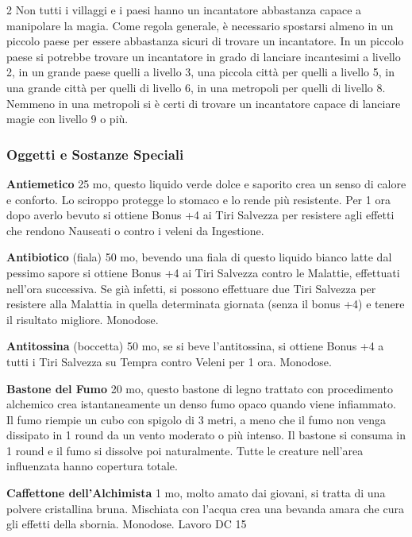 \begin{multicols}{2}
Non tutti i villaggi e i paesi hanno un incantatore abbastanza capace a manipolare la magia. Come regola generale, è necessario spostarsi almeno in un piccolo paese per essere abbastanza sicuri di trovare un incantatore. In un piccolo paese si potrebbe trovare un incantatore in grado di lanciare incantesimi a livello 2, in un grande paese quelli a livello 3, una piccola città per quelli a livello 5, in una grande città per quelli di livello 6, in una metropoli per quelli di livello 8. Nemmeno in una metropoli si è certi di trovare un incantatore capace di lanciare magie con livello 9 o più.


\subsubsection{Oggetti e Sostanze Speciali}

\textbf{Antiemetico} 25 mo, questo liquido verde dolce e saporito crea un senso di calore e conforto. Lo sciroppo protegge lo stomaco e lo rende più resistente. Per 1 ora dopo averlo bevuto si ottiene Bonus +4 ai Tiri Salvezza per resistere agli effetti che rendono Nauseati o contro i veleni da Ingestione.

\textbf{Antibiotico} (fiala) 50 mo, bevendo una fiala di questo liquido bianco latte dal pessimo sapore si ottiene Bonus +4 ai Tiri Salvezza contro le Malattie, effettuati nell'ora successiva. Se già infetti, si possono effettuare due Tiri Salvezza per resistere alla Malattia in quella determinata giornata (senza il bonus +4) e tenere il risultato migliore. Monodose.

\textbf{Antitossina} (boccetta) 50 mo, se si beve l'antitossina, si ottiene Bonus +4 a tutti i Tiri Salvezza su Tempra contro Veleni per 1 ora. Monodose.

\textbf{Bastone del Fumo} 20 mo, questo bastone di legno trattato con procedimento alchemico crea istantaneamente un denso fumo opaco quando viene infiammato. Il fumo riempie un cubo con spigolo di 3 metri, a meno che il fumo non venga dissipato in 1 round da un vento moderato o più intenso. Il bastone si consuma in 1 round e il fumo si dissolve poi naturalmente. Tutte le creature nell'area influenzata hanno copertura totale.

\textbf{Caffettone dell'Alchimista} 1 mo, molto amato dai giovani, si tratta di una polvere cristallina bruna. Mischiata con l'acqua crea una bevanda amara che cura gli effetti della sbornia. Monodose. Lavoro DC 15


\end{multicols}
